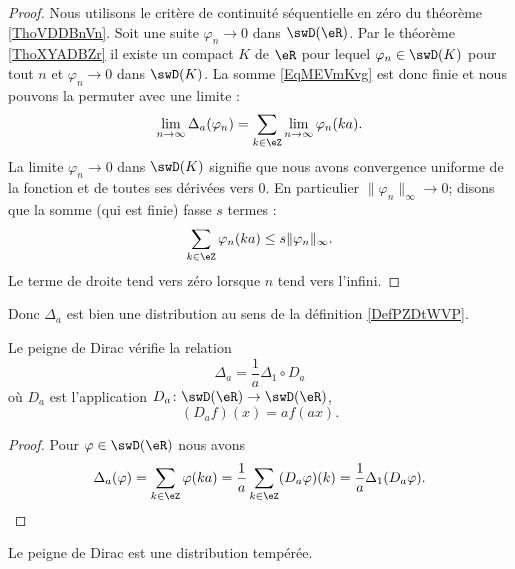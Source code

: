 \begin{proof}
    Nous utilisons le critère de continuité séquentielle en zéro du théorème \ref{ThoVDDBnVn}. Soit une suite \( \varphi_n\to 0\) dans \( \swD(\eR)\). Par le théorème \ref{ThoXYADBZr} il existe un compact \( K\) de \( \eR\) pour lequel \( \varphi_n\in\swD(K)\) pour tout \( n\) et \( \varphi_n\to0\) dans \( \swD(K)\). La somme \ref{EqMEVmKvg} est donc finie et nous pouvons la permuter avec une limite :
    \begin{equation}
        \lim_{n\to \infty} \Delta_a(\varphi_n)=\sum_{k\in\eZ}\lim_{n\to \infty} \varphi_n(ka).
    \end{equation}
    La limite \( \varphi_n\to 0\) dans \( \swD(K)\) signifie que nous avons convergence uniforme de la fonction et de toutes ses dérivées vers \( 0\). En particulier \( \| \varphi_n \|_{\infty}\to 0\); disons que la somme (qui est finie) fasse \( s\) termes :
    \begin{equation}
        \sum_{k\in \eZ}\varphi_n(ka)\leq s\| \varphi_n \|_{\infty}.
    \end{equation}
    Le terme de droite tend vers zéro lorsque \( n\) tend vers l'infini.
\end{proof}
Donc \( \Delta_a\) est bien une distribution au sens de la définition \ref{DefPZDtWVP}.

\begin{lemma}
    Le peigne de Dirac vérifie la relation
    \begin{equation}
        \Delta_a=\frac{1}{ a }\Delta_1\circ D_a
    \end{equation}
    où \( D_a\) est l'application \( D_a\colon \swD(\eR)\to \swD(\eR)\),
    \begin{equation}
        (D_af)(x)=af(ax).
    \end{equation}
\end{lemma}

\begin{proof}
    Pour \( \varphi\in\swD(\eR)\) nous avons
    \begin{equation}
        \Delta_a(\varphi)=\sum_{k\in \eZ}\varphi(ka)=\frac{1}{ a }\sum_{k\in \eZ}(D_a\varphi)(k)=\frac{1}{ a }\Delta_1(D_a\varphi).
    \end{equation}
\end{proof}

\begin{proposition}
    Le peigne de Dirac est une distribution tempérée.
\end{proposition}

